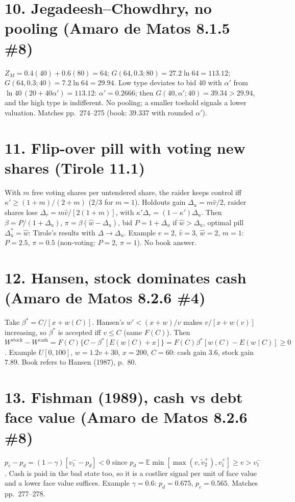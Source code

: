 \documentclass[11pt,a4paper]{article}
\newcommand{\E}{\mathbb{E}}
\begin{document}
\section*{10. Jegadeesh--Chowdhry, no pooling (Amaro de Matos 8.1.5 \#8)}
$Z_M=0.4(40)+0.6(80)=64$; $G(64,0.3;80)=27.2\ln64=113.12$; $G(64,0.3;40)=7.2\ln64=29.94$.
Low type deviates to bid 40 with $\alpha'$ from $\ln40\,(20+40\alpha')=113.12$: $\alpha'=0.2666$; then
$G(40,\alpha';40)=39.34>29.94$, and the high type is indifferent. No pooling; a smaller toehold signals a
lower valuation. Matches pp.~274--275 (book: 39.337 with rounded $\alpha'$).

\section*{11. Flip-over pill with voting new shares (Tirole 11.1)}
With $m$ free voting shares per untendered share, the raider keeps control iff $\kappa'\ge(1+m)/(2+m)$
($2/3$ for $m=1$). Holdouts gain $\Delta_u=m\hat v/2$, raider shares lose $\Delta_r=m\hat v/[2(1+m)]$, with
$\kappa'\Delta_r=(1-\kappa')\Delta_u$. Then $\beta=P/(1+\Delta_u)$, $\pi=\beta(\hat w-\Delta_u)$, bid $P=1+\Delta_u$
if $\hat w>\Delta_u$, optimal pill $\Delta_u^*=\hat w$: Tirole's results with $\Delta\to\Delta_u$. Example
$v=2$, $\hat v=3$, $\hat w=2$, $m=1$: $P=2.5$, $\pi=0.5$ (non-voting: $P=2$, $\pi=1$). No book answer.

\section*{12. Hansen, stock dominates cash (Amaro de Matos 8.2.6 \#4)}
Take $\beta^*=C/[x+w(C)]$. Hansen's $w'<(x+w)/v$ makes $v/[x+w(v)]$ increasing, so $\beta^*$ is accepted iff
$v\le C$ (same $F(C)$). Then $W^{\text{stock}}-W^{\text{cash}}=F(C)\{C-\beta^*[E(w\mid C)+x]\}
=F(C)\beta^*[w(C)-E(w\mid C)]\ge0$. Example $U[0,100]$, $w=1.2v+30$, $x=200$, $C=60$: cash gain $3.6$,
stock gain $7.89$. Book refers to Hansen (1987), p.~80.

\section*{13. Fishman (1989), cash vs debt face value (Amaro de Matos 8.2.6 \#8)}
$p_c-p_d=(1-\gamma)[v_1^--p_d]<0$ since $p_d=\E\min[\max(v,\tilde v_2^+),v_1^+]\ge v>v_1^-$. Cash is paid in
the bad state too, so it is a costlier signal per unit of face value and a lower face value suffices. Example $\gamma=0.6$: $p_d=0.675$,
$p_c=0.565$. Matches pp.~277--278.
\end{document}
